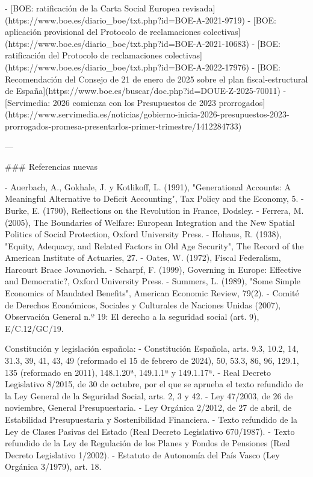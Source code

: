 \documentclass[10pt,a4paper]{article}
\begin{document}
- [BOE: ratificación de la Carta Social Europea revisada](https://www.boe.es/diario_boe/txt.php?id=BOE-A-2021-9719)
- [BOE: aplicación provisional del Protocolo de reclamaciones colectivas](https://www.boe.es/diario_boe/txt.php?id=BOE-A-2021-10683)
- [BOE: ratificación del Protocolo de reclamaciones colectivas](https://www.boe.es/diario_boe/txt.php?id=BOE-A-2022-17976)
- [BOE: Recomendación del Consejo de 21 de enero de 2025 sobre el plan fiscal-estructural de España](https://www.boe.es/buscar/doc.php?id=DOUE-Z-2025-70011)
- [Servimedia: 2026 comienza con los Presupuestos de 2023 prorrogados](https://www.servimedia.es/noticias/gobierno-inicia-2026-presupuestos-2023-prorrogados-promesa-presentarlos-primer-trimestre/1412284733)

---

### Referencias nuevas

- Auerbach, A., Gokhale, J. y Kotlikoff, L. (1991), "Generational Accounts: A Meaningful Alternative to Deficit Accounting", Tax Policy and the Economy, 5.
- Burke, E. (1790), Reflections on the Revolution in France, Dodsley.
- Ferrera, M. (2005), The Boundaries of Welfare: European Integration and the New Spatial Politics of Social Protection, Oxford University Press.
- Hohaus, R. (1938), "Equity, Adequacy, and Related Factors in Old Age Security", The Record of the American Institute of Actuaries, 27.
- Oates, W. (1972), Fiscal Federalism, Harcourt Brace Jovanovich.
- Scharpf, F. (1999), Governing in Europe: Effective and Democratic?, Oxford University Press.
- Summers, L. (1989), "Some Simple Economics of Mandated Benefits", American Economic Review, 79(2).
- Comité de Derechos Económicos, Sociales y Culturales de Naciones Unidas (2007), Observación General n.º 19: El derecho a la seguridad social (art. 9), E/C.12/GC/19.

Constitución y legislación española:
- Constitución Española, arts. 9.3, 10.2, 14, 31.3, 39, 41, 43, 49 (reformado el 15 de febrero de 2024), 50, 53.3, 86, 96, 129.1, 135 (reformado en 2011), 148.1.20ª, 149.1.1ª y 149.1.17ª.
- Real Decreto Legislativo 8/2015, de 30 de octubre, por el que se aprueba el texto refundido de la Ley General de la Seguridad Social, arts. 2, 3 y 42.
- Ley 47/2003, de 26 de noviembre, General Presupuestaria.
- Ley Orgánica 2/2012, de 27 de abril, de Estabilidad Presupuestaria y Sostenibilidad Financiera.
- Texto refundido de la Ley de Clases Pasivas del Estado (Real Decreto Legislativo 670/1987).
- Texto refundido de la Ley de Regulación de los Planes y Fondos de Pensiones (Real Decreto Legislativo 1/2002).
- Estatuto de Autonomía del País Vasco (Ley Orgánica 3/1979), art. 18.
\end{document}
